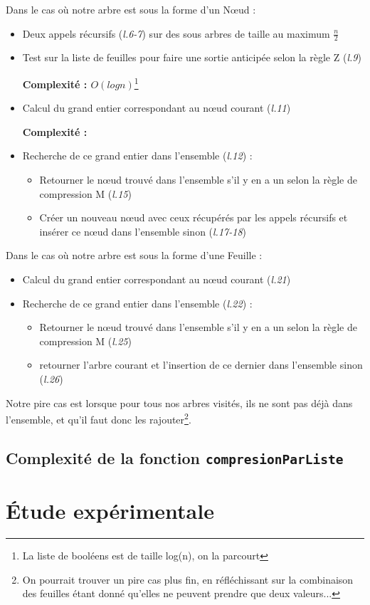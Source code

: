\documentclass[12pt,a4paper]{article}
\begin{document}
Dans le cas où notre arbre est sous la forme d'un Nœud : 
\begin{itemize}
\item Deux appels récursifs (\textit{l.6-7}) sur des sous arbres de taille au maximum $\frac{n}{2}$
\item Test sur la liste de feuilles pour faire une sortie anticipée selon la règle Z (\textit{l.9}) 

\textbf{Complexité : $O(log n)$}\footnote{La liste de booléens est de taille log(n), on la parcourt}
\item Calcul du grand entier correspondant au nœud courant (\textit{l.11}) 

\textbf{Complexité : } 
\item Recherche de ce grand entier dans l'ensemble (\textit{l.12}) :

\begin{itemize}
\item Retourner le nœud trouvé dans l'ensemble s'il y en a un selon la règle de compression M (\textit{l.15})
\item Créer un nouveau nœud avec ceux récupérés par les appels récursifs et insérer ce nœud dans l'ensemble sinon (\textit{l.17-18})
\end{itemize}

\end{itemize}

Dans le cas où notre arbre est sous la forme d'une Feuille : 
\begin{itemize}
\item Calcul du grand entier correspondant au nœud courant (\textit{l.21})
\item Recherche de ce grand entier dans l'ensemble (\textit{l.22}) :
\begin{itemize}
\item Retourner le nœud trouvé dans l'ensemble s'il y en a un selon la règle de compression M (\textit{l.25})
\item retourner l'arbre courant et l'insertion de ce dernier dans l'ensemble sinon (\textit{l.26})
\end{itemize}

\end{itemize}

Notre pire cas est lorsque pour tous nos arbres visités, ils ne sont pas déjà dans l'ensemble, et qu'il faut donc les rajouter\footnote{On pourrait trouver un pire cas plus fin, en réfléchissant sur la combinaison des feuilles étant donné qu'elles ne peuvent prendre que deux valeurs...}.



\subsection{Complexité de la fonction \texttt{compresionParListe}}


\section{Étude expérimentale}
\end{document}
